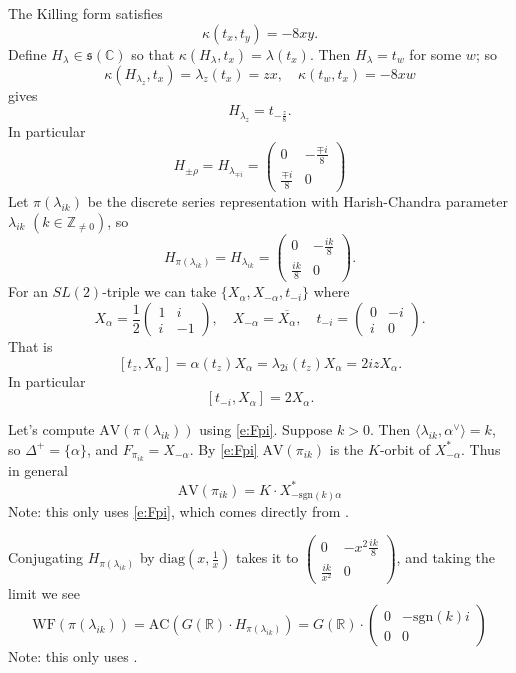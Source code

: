 \documentclass[10pt,leqno]{article}
\numberwithin{equation}{section}
\newcommand{\sgn}{\mathrm{sgn}}
\newcommand{\R}{\mathbb R}
\newcommand{\C}{\mathbb C}
\newcommand{\Z}{\mathbb Z}
\newcommand{\ch}[1]{#1^\vee}
\newcommand{\s}{\mathfrak s}
\newcommand{\AV}{\mathrm{AV}}
\newcommand{\WF}{\mathrm{WF}}
\newcommand{\AC}{\mathrm{AC}}
\begin{document}
The Killing form satisfies
$$
\kappa(t_x,t_y)=-8xy.
$$
Define $H_{\lambda}\in \s(\C)$ so that $\kappa(H_\lambda,t_x)=\lambda(t_x)$. Then $H_\lambda=t_w$ for some $w$; so
$$
\kappa(H_{\lambda_z},t_x)=\lambda_z(t_x)=zx,\quad \kappa(t_w,t_x)=-8xw
$$
gives
$$
H_{\lambda_z}=t_{-\frac z8}.
$$
In particular
$$
H_{\pm \rho}=H_{\lambda_{\mp i}}=\begin{pmatrix}0&-\frac {\mp i}8\\\frac {\mp i}8&0
\end{pmatrix}
$$
Let $\pi(\lambda_{ik})$ be the discrete series representation with Harish-Chandra parameter $\lambda_{ik}$ $(k\in \Z_{\ne 0})$, so
$$
H_{\pi(\lambda_{ik})}=H_{\lambda_{ik}}=
\begin{pmatrix}0&-\frac{ik}8\\\frac{ik}8&0
\end{pmatrix}.
$$
For an $SL(2)$-triple we can take $\{X_\alpha,X_{-\alpha},t_{-i}\}$ where
$$
X_\alpha=\frac12\begin{pmatrix}1&i\\i&-1
\end{pmatrix}, \quad X_{-\alpha}=\overline{X_\alpha}, \quad t_{-i}=\begin{pmatrix}0&-i\\i&0
\end{pmatrix}.
$$
That is
$$
[t_z,X_\alpha]=\alpha(t_z)X_\alpha=\lambda_{2i}(t_z)X_\alpha=2izX_\alpha.
$$
In particular
$$
[t_{-i},X_\alpha]=2X_\alpha.
$$

Let's compute $\AV(\pi(\lambda_{ik}))$ using  \eqref{e:Fpi}.
Suppose $k>0$. Then $\langle \lambda_{ik},\ch\alpha\rangle=k$, so $\Delta^+=\{\alpha\}$, and
$F_{\pi_{ik}}=X_{-\alpha}$. 
By \eqref{e:Fpi} $\AV(\pi_{ik})$ is the $K$-orbit of $X_{-\alpha}^\ast$.
Thus in general
$$
\AV(\pi_{ik})=K\cdot X^*_{-\sgn(k)\alpha}
$$
Note: this only uses \eqref{e:Fpi}, which comes directly from \cite{AV1}.

Conjugating $H_{\pi(\lambda_{ik})}$ by $\mathrm{diag}(x,\frac 1x)$ takes it to
$\begin{pmatrix}0&-x^2\frac{ik}8\\\frac{ik}{x^2}&0
\end{pmatrix}$,
and taking the limit we see
$$
\WF(\pi(\lambda_{ik}))=\AC(G(\R)\cdot H_{\pi(\lambda_{ik})})=
G(\R)\cdot \begin{pmatrix}0&-\sgn(k)i\\0&0
\end{pmatrix}
$$
Note: this only uses  \cite{HarrisHeOlafsson}.
\end{document}

